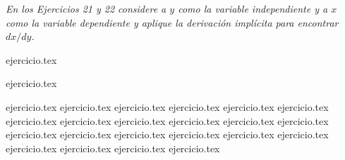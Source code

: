 \noindent \textit{En los Ejercicios 21 y 22 considere a $y$ como la variable independiente y a $x$ como la variable dependiente y aplique la derivación implícita para encontrar $dx/dy$.}

\begin{enumerate}
    \begin{minipage}{0.45\textwidth}
    \setcounter{enumi}{20}
    {ejercicio.tex}
    \end{minipage}%
    \begin{minipage}{0.45\textwidth}
    \setcounter{enumi}{21}
    {ejercicio.tex}
    \end{minipage}
\end{enumerate}

\begin{enumerate}
    \setcounter{enumi}{22}
    {ejercicio.tex}
    {ejercicio.tex}
    \setcounter{enumi}{24}
    {ejercicio.tex}
    {ejercicio.tex}
    {ejercicio.tex}
    {ejercicio.tex}
    {ejercicio.tex}
    {ejercicio.tex}
    \setcounter{enumi}{30}
    {ejercicio.tex}
    {ejercicio.tex}
    {ejercicio.tex}
    {ejercicio.tex}
    {ejercicio.tex}
    {ejercicio.tex}
    \setcounter{enumi}{36}
    {ejercicio.tex}
    {ejercicio.tex}
    \setcounter{enumi}{38}
    {ejercicio.tex}
    {ejercicio.tex}
    {ejercicio.tex}
    {ejercicio.tex}
    \setcounter{enumi}{42}
    {ejercicio.tex}
    {ejercicio.tex}
\end{enumerate}

